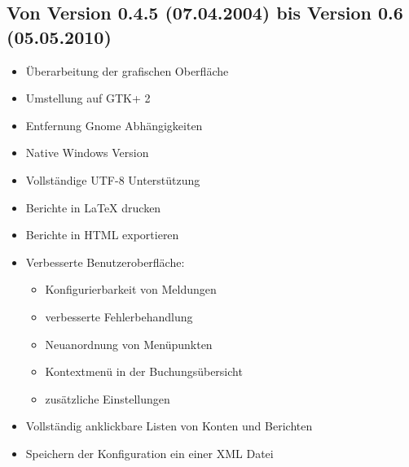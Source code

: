 \subsection{Von Version 0.4.5 \textnormal{(07.04.2004)} bis Version 0.6 \textnormal{(05.05.2010)}}%

\begin{itemize}
	\item Überarbeitung der grafischen Oberfläche%
	\item Umstellung auf \gls{GTK}+ 2%
	\item Entfernung \gls{Gnome} Abhängigkeiten%
	\item Native Windows Version%
	\item Vollständige \gls{UTF-8} Unterstützung%
	\item Berichte in \gls{LaTeX} drucken%
	\item Berichte in \gls{HTML} exportieren%
	\item Verbesserte Benutzeroberfläche:%
		\begin{itemize}
		\item[\textopenbullet] Konfigurierbarkeit von Meldungen%
		\item[\textopenbullet] verbesserte Fehlerbehandlung%
		\item[\textopenbullet] Neuanordnung von Menüpunkten%
		\item[\textopenbullet] Kontextmenü in der Buchungsübersicht%
		\item[\textopenbullet] zusätzliche Einstellungen%
		\end{itemize}
	\item Vollständig anklickbare Listen von Konten und Berichten%
	\item Speichern der Konfiguration ein einer \gls{XML} Datei%

\end{itemize}
